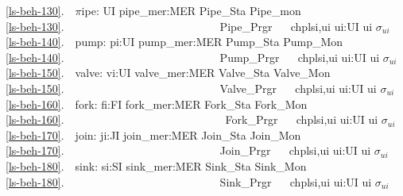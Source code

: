 \ref{ls-beh-130}.\ \ $\pi$ipe: UI {\RIGHTARROW} pipe\_mer:MER {\RIGHTARROW} Pipe\_Sta {\RIGHTARROW} Pipe\_mon {\RIGHTARROW}\ \ \ \ \ \\
\ref{ls-beh-130}.\ \ \ \ \ \ \ \ \ \ \ \ \ \ \ \ \ \ \ \ \ \ \ \ \ \ \ \ Pipe\_Prgr {\RIGHTARROW}\ \ {\LBRACE} ch{\LBRACKET}{\LBRACE}plsi,ui{\RBRACE}{\RBRACKET} {\BAR} ui:UI {\RDOT} ui {\ISIN} $\sigma$$_{ui}$ {\RBRACE}  \\
\ref{ls-beh-140}.\ \ pump: pi:UI {\RIGHTARROW} pump\_mer:MER {\RIGHTARROW} Pump\_Sta {\RIGHTARROW} Pump\_Mon {\RIGHTARROW}\ \ \ \ \ \\
\ref{ls-beh-140}.\ \ \ \ \ \ \ \ \ \ \ \ \ \ \ \ \ \ \ \ \ \ \ \ \ \ \ \ Pump\_Prgr {\RIGHTARROW}\ \ {\LBRACE} ch{\LBRACKET}{\LBRACE}plsi,ui{\RBRACE}{\RBRACKET} {\BAR} ui:UI {\RDOT} ui {\ISIN} $\sigma$$_{ui}$ {\RBRACE}  \\
\ref{ls-beh-150}.\ \ valve: vi:UI {\RIGHTARROW} valve\_mer:MER {\RIGHTARROW} Valve\_Sta {\RIGHTARROW} Valve\_Mon {\RIGHTARROW} \ \ \ \ \\
\ref{ls-beh-150}.\ \ \ \ \ \ \ \ \ \ \ \ \ \ \ \ \ \ \ \ \ \ \ \ \ \ \ \ Valve\_Prgr {\RIGHTARROW}\ \ {\LBRACE} ch{\LBRACKET}{\LBRACE}plsi,ui{\RBRACE}{\RBRACKET} {\BAR} ui:UI {\RDOT} ui {\ISIN} $\sigma$$_{ui}$ {\RBRACE}  \\
\ref{ls-beh-160}.\ \ fork: fi:FI {\RIGHTARROW} fork\_mer:MER {\RIGHTARROW} Fork\_Sta {\RIGHTARROW} Fork\_Mon {\RIGHTARROW}\ \ \ \ \ \\
\ref{ls-beh-160}.\ \ \ \ \ \ \ \ \ \ \ \ \ \ \ \ \ \ \ \ \ \ \ \ \ \ \ \ \ Fork\_Prgr {\RIGHTARROW}\ \ {\LBRACE} ch{\LBRACKET}{\LBRACE}plsi,ui{\RBRACE}{\RBRACKET} {\BAR} ui:UI {\RDOT} ui {\ISIN} $\sigma$$_{ui}$ {\RBRACE}  \\
\ref{ls-beh-170}.\ \ join: ji:JI {\RIGHTARROW} join\_mer:MER {\RIGHTARROW} Join\_Sta {\RIGHTARROW} Join\_Mon {\RIGHTARROW} \ \ \ \ \\
\ref{ls-beh-170}.\ \ \ \ \ \ \ \ \ \ \ \ \ \ \ \ \ \ \ \ \ \ \ \ \ \ \ \ Join\_Prgr {\RIGHTARROW}\ \ {\LBRACE} ch{\LBRACKET}{\LBRACE}plsi,ui{\RBRACE}{\RBRACKET} {\BAR} ui:UI {\RDOT} ui {\ISIN} $\sigma$$_{ui}$ {\RBRACE}  \\
\ref{ls-beh-180}.\ \ sink: si:SI {\RIGHTARROW} sink\_mer:MER {\RIGHTARROW} Sink\_Sta {\RIGHTARROW} Sink\_Mon {\RIGHTARROW} \ \ \ \ \\
\ref{ls-beh-180}.\ \ \ \ \ \ \ \ \ \ \ \ \ \ \ \ \ \ \ \ \ \ \ \ \ \ \ \ Sink\_Prgr {\RIGHTARROW}\ \ {\LBRACE} ch{\LBRACKET}{\LBRACE}plsi,ui{\RBRACE}{\RBRACKET} {\BAR} ui:UI {\RDOT} ui {\ISIN} $\sigma$$_{ui}$ {\RBRACE} \ \ 
\ep

